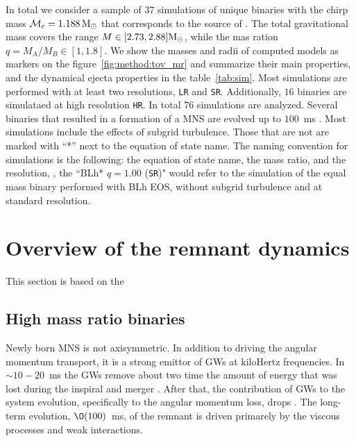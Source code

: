 In total we consider a sample of $37$ simulations of unique binaries with the 
chirp mass $\mathcal{M}_c = 1.188\,{\text{M}_{\odot}}$ that corresponds to the source of \GW{}.
The total gravitational mass covers the range $M\in[2.73, 2.88]{\text{M}_{\odot}}$, while the 
mas ration $q=M_A/M_B\in[1,1.8]$. 
We show the masses and radii of computed models as markers on the 
figure~\ref{fig:method:tov_mr} and summarize their main properties, 
and the dynamical ejecta properties in the table~\ref{tab:sim}.
Most simulations are performed with at least two resolutions, 
\texttt{LR} and \texttt{SR}. 
Additionally, $16$ binaries are simulataed at high resolution \texttt{HR}.
In total $76$ simulations are analyzed.
Several binaries that resulted in a formation of a MNS are evolved up to 
$100$~ms \pmerg.
Most simulations include the effects of subgrid turbulence. 
Those that are not are marked with ``*'' next to the equation of state name.
The naming convention for simulations is the following: 
the equation of state name, the mass ratio, and the resolution, \eg, 
the ``BLh* $q=1.00$ (\texttt{SR})" would refer to the simulation of the equal mass
binary performed with BLh EOS, without subgrid turbulence and at standard resolution. 



\section{Overview of the remnant dynamics}
\label{sec:bns_dynsmics_overview}


This section is based on the \cite{Nedora:2020pak}

\subsection{High mass ratio binaries}

Newly born \ac{MNS} is not axisymmetric. In addition to driving the angular 
momentum transport, it is a strong emittor of \acp{GW} at kiloHertz frequencies.
In ${\sim}10-20$~ms \pmerg{} the \acp{GW} remove about two time the 
amount of energy that was lost during the inspiral and merger \citep{Bernuzzi:2015opx}.
After that, the contribution of \acp{GW} to the system evolution, specifically to the angular momentum loss, drops \citep{Radice:2018xqa}. 
The long-term evolution, $\O(100)$~ms, of the remnant is driven primarely by the viscous processes and weak interactions.

